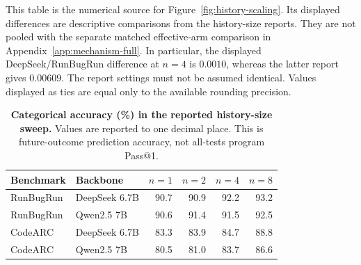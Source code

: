 \documentclass{article}
\begin{document}
\begin{table}[t]
\centering
\small
\caption{Primary history-size sweep with both fixed and effective mass. Values are future-outcome NLL; lower is better. Displayed precision is four decimals.}
\setlength{\tabcolsep}{5pt}
\label{tab:history-full}
\end{table}

This table is the numerical source for Figure~\ref{fig:history-scaling}. Its displayed differences are descriptive comparisons from the history-size reports. They are not pooled with the separate matched effective-arm comparison in Appendix~\ref{app:mechanism-full}. In particular, the displayed DeepSeek/RunBugRun difference at $n=4$ is $0.0010$, whereas the latter report gives $0.00609$. The report settings must not be assumed identical. Values displayed as ties are equal only to the available rounding precision.


\begin{table}[htbp]
\centering
\small
\caption{\textbf{Categorical accuracy (\%) in the reported history-size sweep.} Values are reported to one decimal place. This is future-outcome prediction accuracy, not all-tests program Pass@1.}
\setlength{\tabcolsep}{7pt}
\begin{tabular}{llrrrr}
\toprule
Benchmark & Backbone & $n=1$ & $n=2$ & $n=4$ & $n=8$ \\
\midrule
RunBugRun & DeepSeek 6.7B & 90.7 & 90.9 & 92.2 & 93.2 \\
RunBugRun & Qwen2.5 7B & 90.6 & 91.4 & 91.5 & 92.5 \\
CodeARC & DeepSeek 6.7B & 83.3 & 83.9 & 84.7 & 88.8 \\
CodeARC & Qwen2.5 7B & 80.5 & 81.0 & 83.7 & 86.6 \\
\bottomrule
\end{tabular}
\label{tab:history-accuracy}
\end{table}
\end{document}
